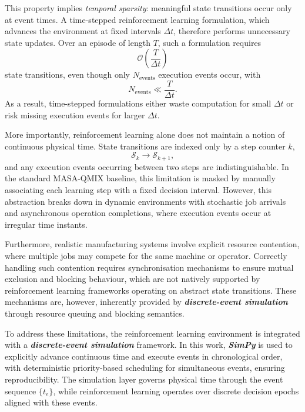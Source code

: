 This property implies \emph{temporal sparsity}: meaningful state transitions occur only at event times. A time-stepped reinforcement learning formulation, which advances the environment at fixed intervals $\Delta t$, therefore performs unnecessary state updates. Over an episode of length $T$, such a formulation requires
\begin{equation}
\mathcal{O}\!\left(\frac{T}{\Delta t}\right)
\label{eq:time_step_complexity}
\end{equation}
state transitions, even though only $N_{\text{events}}$ execution events occur, with
\begin{equation}
N_{\text{events}} \ll \frac{T}{\Delta t}.
\label{eq:event_vs_timestep}
\end{equation}
As a result, time-stepped formulations either waste computation for small $\Delta t$ or risk missing execution events for larger $\Delta t$.

More importantly, reinforcement learning alone does not maintain a notion of continuous physical time. State transitions are indexed only by a step counter $k$,
\begin{equation}
\mathcal{S}_k \rightarrow \mathcal{S}_{k+1},
\label{eq:rl_step_transition}
\end{equation}
and any execution events occurring between two steps are indistinguishable. In the standard MASA-QMIX baseline, this limitation is masked by manually associating each learning step with a fixed decision interval. However, this abstraction breaks down in dynamic environments with stochastic job arrivals and asynchronous operation completions, where execution events occur at irregular time instants.

Furthermore, realistic manufacturing systems involve explicit resource contention, where multiple jobs may compete for the same machine or operator. Correctly handling such contention requires synchronisation mechanisms to ensure mutual exclusion and blocking behaviour, which are not natively supported by reinforcement learning frameworks operating on abstract state transitions. These mechanisms are, however, inherently provided by \textbf{\emph{discrete-event simulation}} through resource queuing and blocking semantics.

To address these limitations, the reinforcement learning environment is integrated with a \textbf{\emph{discrete-event simulation}} framework. In this work, \textbf{\emph{SimPy}} is used to explicitly advance continuous time and execute events in chronological order, with deterministic priority-based scheduling for simultaneous events, ensuring reproducibility. The simulation layer governs physical time through the event sequence $\{t_e\}$, while reinforcement learning operates over discrete decision epochs aligned with these events.

